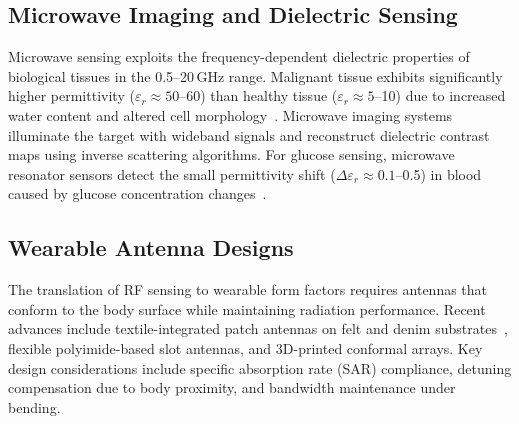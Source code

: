 \documentclass[journal,twoside]{IEEEtran}
\begin{document}
\subsection{Microwave Imaging and Dielectric Sensing}

Microwave sensing exploits the frequency-dependent dielectric properties of biological tissues in the 0.5--20\,GHz range. Malignant tissue exhibits significantly higher permittivity ($\varepsilon_r \approx 50$--60) than healthy tissue ($\varepsilon_r \approx 5$--10) due to increased water content and altered cell morphology~\cite{ref_uwb_breast2024}. Microwave imaging systems illuminate the target with wideband signals and reconstruct dielectric contrast maps using inverse scattering algorithms. For glucose sensing, microwave resonator sensors detect the small permittivity shift ($\Delta\varepsilon_r \approx 0.1$--0.5) in blood caused by glucose concentration changes~\cite{ref_glucose_dualband2025}.

\subsection{Wearable Antenna Designs}

The translation of RF sensing to wearable form factors requires antennas that conform to the body surface while maintaining radiation performance. Recent advances include textile-integrated patch antennas on felt and denim substrates~\cite{ref_metamaterial_cancer2024}, flexible polyimide-based slot antennas, and 3D-printed conformal arrays. Key design considerations include specific absorption rate (SAR) compliance, detuning compensation due to body proximity, and bandwidth maintenance under bending.
\end{document}
